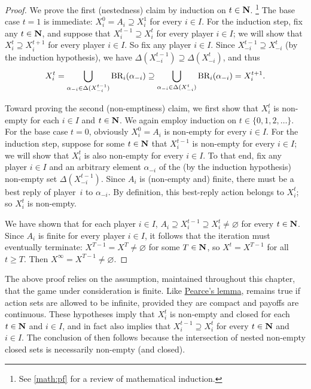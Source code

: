 \begin{proof}
	We prove the first (nestedness) claim by induction on $t \in \mathbf{N}$.%
		\footnote{See \cref{math:pf} for a review of mathematical induction.}
	The base case $t=1$ is immediate: $X^0_i = A_i \supseteq X^1_i$ for every $i \in I$. For the induction step, fix any $t \in \mathbf{N}$, and suppose that $X^{t-1}_i \supseteq X^t_i$ for every player $i \in I$; we will show that $X^t_i \supseteq X^{t+1}_i$ for every player $i \in I$. So fix any player $i \in I$. Since $X^{t-1}_{-i} \supseteq X^t_{-i}$ (by the induction hypothesis), we have $\Delta(X^{t-1}_{-i}) \supseteq \Delta(X^t_{-i})$, and thus
	\begin{equation*}
		X^t_i
		= \bigcup_{\alpha_{-i} \in \Delta(X^{t-1}_{-i})} \text{BR}_i(\alpha_{-i})
		\supseteq \bigcup_{\alpha_{-i} \in \Delta(X^t_{-i})} \text{BR}_i(\alpha_{-i})
		= X^{t+1}_i .
	\end{equation*}

	Toward proving the second (non-emptiness) claim, we first show that $X^t_i$ is non-empty for each $i \in I$ and $t \in \mathbf{N}$. We again employ induction on $t \in \{0,1,2,\dots\}$. For the base case $t=0$, obviously $X^0_i = A_i$ is non-empty for every $i \in I$. For the induction step, suppose for some $t \in \mathbf{N}$ that $X^{t-1}_i$ is non-empty for every $i \in I$; we will show that $X^t_i$ is also non-empty for every $i \in I$. To that end, fix any player $i \in I$ and an arbitrary element $\alpha_{-i}$ of the (by the induction hypothesis) non-empty set $\Delta(X^{t-1}_{-i})$. Since $A_i$ is (non-empty and) finite, there must be a best reply of player~$i$ to $\alpha_{-i}$. By definition, this best-reply action belongs to $X^t_i$; so $X^t_i$ is non-empty.

	We have shown that for each player $i \in I$, $A_i \supseteq X^{t-1}_i \supseteq X^t_i \neq \varnothing$ for every $t \in \mathbf{N}$. Since $A_i$ is finite for every player $i \in I$, it follows that the iteration must eventually terminate: $X^{T-1} = X^T \neq \varnothing$ for some $T \in \mathbf{N}$, so $X^t = X^{T-1}$ for all $t \geq T$. Then $X^\infty = X^{T-1} \neq \varnothing$.
\end{proof}

\begin{remark}
	\label{remark:rbty_nonempty_finite}
	The above proof relies on the assumption, maintained throughout this chapter, that the game under consideration is finite.
	Like \hyperref[lemma:pearce]{Pearce's lemma},  remains true if action sets are allowed to be infinite, provided they are compact and payoffs are continuous. These hypotheses imply that $X^t_i$ is non-empty and closed for each $t \in \mathbf{N}$ and $i \in I$, and in fact also implies that $X^{t-1}_i \supseteq X^t_i$ for every $t \in \mathbf{N}$ and $i \in I$. The conclusion of  then follows because the intersection of nested non-empty closed sets is necessarily non-empty (and closed).
\end{remark}

